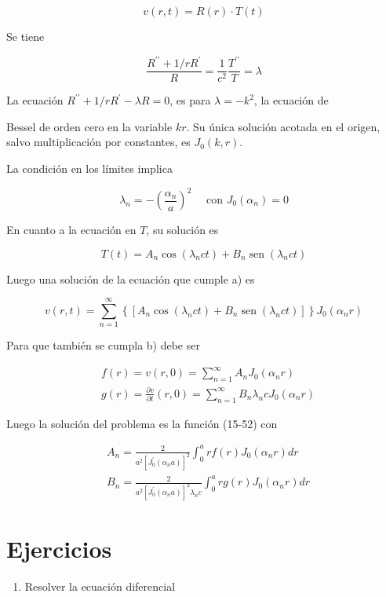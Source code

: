 \documentclass[10pt]{article}
\theoremstyle{plain}
\theoremstyle{definition}
\theoremstyle{remark}
\begin{document}
$$
v(r, t)=R(r) \cdot T(t)
$$

Se tiene

$$
\frac{R^{\prime \prime}+1 / r R^{\prime}}{R}=\frac{1}{c^{2}} \frac{T^{\prime \prime}}{T}=\lambda
$$

La ecuación $R^{\prime \prime}+1 / r R^{\prime}-\lambda R=0$, es para $\lambda=-k^{2}$, la ecuación de

Bessel de orden cero en la variable $k r$. Su única solución acotada en el origen, salvo multiplicación por constantes, es $J_{0}(k, r)$.

La condición en los límites implica

$$
\lambda_{n}=-\left(\frac{\alpha_{n}}{a}\right)^{2} \quad \text { con } J_{0}\left(\alpha_{n}\right)=0
$$

En cuanto a la ecuación en $T$, su solución es

$$
T(t)=A_{n} \cos \left(\lambda_{n} c t\right)+B_{n} \operatorname{sen}\left(\lambda_{n} c t\right)
$$

Luego una solución de la ecuación que cumple a) es


\begin{equation*}
v(r, t)=\sum_{n=1}^{\infty}\left\{\left[A_{n} \cos \left(\lambda_{n} c t\right)+B_{n} \operatorname{sen}\left(\lambda_{n} c t\right)\right]\right\} J_{0}\left(\alpha_{n} r\right) \tag{15-52}
\end{equation*}


Para que también se cumpla b) debe ser

$$
\begin{aligned}
& f(r)=v(r, 0)=\sum_{n=1}^{\infty} A_{n} J_{0}\left(\alpha_{n} r\right) \\
& g(r)=\frac{\partial v}{\partial t}(r, 0)=\sum_{n=1}^{\infty} B_{n} \lambda_{n} c J_{0}\left(\alpha_{n} r\right)
\end{aligned}
$$

Luego la solución del problema es la función (15-52) con

$$
\begin{aligned}
& A_{n}=\frac{2}{a^{2}\left[J_{0}^{\prime}\left(\alpha_{n} a\right)\right]^{2}} \int_{0}^{a} r f(r) J_{0}\left(\alpha_{n} r\right) d r \\
& B_{n}=\frac{2}{a^{2}\left[J_{0}^{\prime}\left(\alpha_{n} a\right)\right]^{2} \lambda_{n} c} \int_{0}^{a} r g(r) J_{0}\left(\alpha_{n} r\right) d r
\end{aligned}
$$

\section*{Ejercicios}
\begin{enumerate}
  \item Resolver la ecuación diferencial
\end{enumerate}
\end{document}
